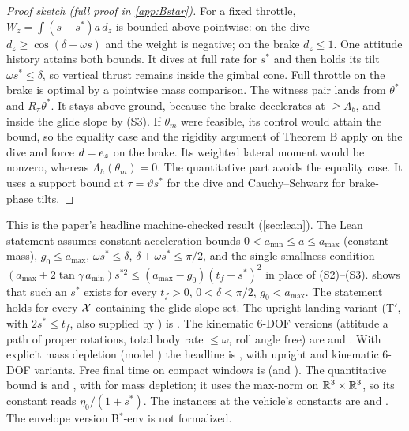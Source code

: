 \begin{proof}[Proof sketch (full proof in \cref{app:Bstar})]
For a fixed throttle, $W_z=\int(s-s^*)a\,d_z$ is bounded above pointwise: on the dive $d_z\ge\cos(\delta+\omega s)$ and the
weight is negative; on the brake $d_z\le1$. One attitude history attains both bounds. It dives at full rate for $s^*$
and then holds its tilt $\omega s^*\le\delta$, so vertical thrust remains inside the gimbal cone. Full throttle on the
brake is optimal by a pointwise mass comparison. The witness pair lands from $\theta^*$ and $R_\pi\theta^*$. It stays
above ground, because the brake decelerates at $\ge A_b$, and inside the glide slope by (S3). If $\theta_m$ were feasible,
its control would attain the bound, so the equality case and the rigidity argument of Theorem B apply on the dive and
force $d=e_z$ on the brake. Its weighted lateral moment would be nonzero, whereas $\Lambda_h(\theta_m)=0$. The
quantitative part avoids the equality case. It uses a support bound at $\tau=\vartheta s^*$ for the dive and
Cauchy--Schwarz for brake-phase tilts.
\end{proof}

\begin{remark}
This is the paper's headline machine-checked result (\cref{sec:lean}). The Lean statement  assumes constant acceleration bounds
$0<a_{\min}\le a\le a_{\max}$ (constant mass), $g_0\le a_{\max}$, $\omega s^*\le\delta$, $\delta+\omega s^*\le\pi/2$, and the
single smallness condition $(a_{\max}+2\tan\gamma\,a_{\min})s^{*2}\le(a_{\max}-g_0)(t_f-s^*)^2$ in place of (S2)--(S3).
 shows that such an $s^*$ exists for every $t_f>0$, $0<\delta<\pi/2$, $g_0<a_{\max}$. The statement
holds for every $\mathcal X$ containing the glide-slope set. The upright-landing variant (T$'$, with $2s^*\le t_f$, also supplied by
) is . The kinematic 6-DOF versions (attitude a path of proper
rotations, total body rate $\le\omega$, roll angle free) are  and
. With explicit mass depletion (model ) the headline is
, with upright and kinematic 6-DOF variants. Free final time on compact windows is
 (and ). The quantitative bound is 
and , with  for mass depletion; it uses the max-norm on
$\mathbb{R}^3\times\mathbb{R}^3$, so its constant reads $\eta_0/(1+s^*)$. The instances at the vehicle's constants are
 and . The envelope version B$^*$-env is not formalized.
\end{remark}


